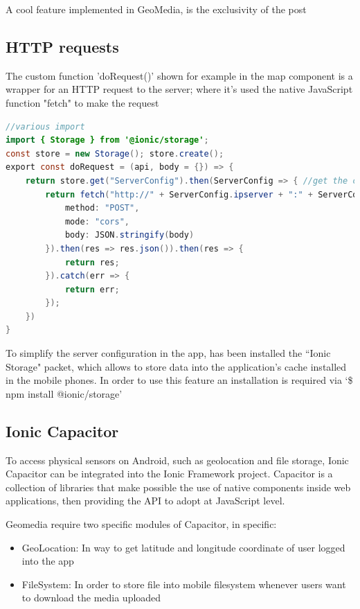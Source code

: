 \documentclass[conference]{IEEEtran}
\begin{document}
A cool feature implemented in GeoMedia, is the exclusivity of the post


\subsection{HTTP requests}

The custom function 'doRequest()' shown for example in the map component is a wrapper for an HTTP request to the server; where it's used the native JavaScript function "fetch" to make the request
\begin{lstlisting}[language=Java, caption=Method doRequest to fetch server]
//various import 
import { Storage } from '@ionic/storage';
const store = new Storage(); store.create();
export const doRequest = (api, body = {}) => {
    return store.get("ServerConfig").then(ServerConfig => { //get the config from cache
        return fetch("http://" + ServerConfig.ipserver + ":" + ServerConfig.port + "/" + api, {
            method: "POST",
            mode: "cors",
            body: JSON.stringify(body)
        }).then(res => res.json()).then(res => {
            return res;
        }).catch(err => {
            return err;
        });
    })
}
\end{lstlisting}


To simplify the server configuration in the app, has been installed the ``Ionic Storage" \cite{b9} packet, which allows to store data into the application's cache installed in the mobile phones. In order to use this feature an installation is required via `\$ npm install @ionic/storage'



\subsection{Ionic Capacitor}

To access physical sensors on Android, such as geolocation and file storage, Ionic Capacitor\cite{b10} can be integrated into the Ionic Framework project. Capacitor is a collection of libraries that make possible the use of native components inside web applications, then providing the API to adopt at JavaScript level.

Geomedia require two specific modules of Capacitor, in specific:
\begin{itemize}
    \item GeoLocation\cite{b2}: In way to get latitude and longitude coordinate of user logged into the app
    \item FileSystem\cite{b3}: In order to store file into mobile filesystem whenever users want to download the media uploaded
\end{itemize}
\end{document}
